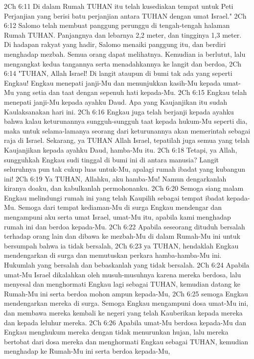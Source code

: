 2Ch 6:11  Di dalam Rumah TUHAN itu telah kusediakan tempat untuk Peti Perjanjian yang berisi batu perjanjian antara TUHAN dengan umat Israel."
2Ch 6:12  Salomo telah membuat panggung perunggu di tengah-tengah halaman Rumah TUHAN. Panjangnya dan lebarnya 2,2 meter, dan tingginya 1,3 meter. Di hadapan rakyat yang hadir, Salomo menaiki panggung itu, dan berdiri menghadap mezbah. Semua orang dapat melihatnya. Kemudian ia berlutut, lalu mengangkat kedua tangannya serta menadahkannya ke langit dan berdoa,
2Ch 6:14  "TUHAN, Allah Israel! Di langit ataupun di bumi tak ada yang seperti Engkau! Engkau menepati janji-Mu dan menunjukkan kasih-Mu kepada umat-Mu yang setia dan taat dengan sepenuh hati kepada-Mu.
2Ch 6:15  Engkau telah menepati janji-Mu kepada ayahku Daud. Apa yang Kaujanjikan itu sudah Kaulaksanakan hari ini.
2Ch 6:16  Engkau juga telah berjanji kepada ayahku bahwa kalau keturunannya sungguh-sungguh taat kepada hukum-Mu seperti dia, maka untuk selama-lamanya seorang dari keturunannya akan memerintah sebagai raja di Israel. Sekarang, ya TUHAN Allah Israel, tepatilah juga semua yang telah Kaujanjikan kepada ayahku Daud, hamba-Mu itu.
2Ch 6:18  Tetapi, ya Allah, sungguhkah Engkau sudi tinggal di bumi ini di antara manusia? Langit seluruhnya pun tak cukup luas untuk-Mu, apalagi rumah ibadat yang kubangun ini!
2Ch 6:19  Ya TUHAN, Allahku, aku hamba-Mu! Namun dengarkanlah kiranya doaku, dan kabulkanlah permohonanku.
2Ch 6:20  Semoga siang malam Engkau melindungi rumah ini yang telah Kaupilih sebagai tempat ibadat kepada-Mu. Semoga dari tempat kediaman-Mu di surga Engkau mendengar dan mengampuni aku serta umat Israel, umat-Mu itu, apabila kami menghadap rumah ini dan berdoa kepada-Mu.
2Ch 6:22  Apabila seseorang dituduh bersalah terhadap orang lain dan dibawa ke mezbah-Mu di dalam Rumah-Mu ini untuk bersumpah bahwa ia tidak bersalah,
2Ch 6:23  ya TUHAN, hendaklah Engkau mendengarkan di surga dan memutuskan perkara hamba-hamba-Mu ini. Hukumlah yang bersalah dan bebaskanlah yang tidak bersalah.
2Ch 6:24  Apabila umat-Mu Israel dikalahkan oleh musuh-musuhnya karena mereka berdosa, lalu menyesal dan menghormati Engkau lagi sebagai TUHAN, kemudian datang ke Rumah-Mu ini serta berdoa mohon ampun kepada-Mu,
2Ch 6:25  semoga Engkau mendengarkan mereka di surga. Semoga Engkau mengampuni dosa umat-Mu ini, dan membawa mereka kembali ke negeri yang telah Kauberikan kepada mereka dan kepada leluhur mereka.
2Ch 6:26  Apabila umat-Mu berdosa kepada-Mu dan Engkau menghukum mereka dengan tidak menurunkan hujan, lalu mereka bertobat dari dosa mereka dan menghormati Engkau sebagai TUHAN, kemudian menghadap ke Rumah-Mu ini serta berdoa kepada-Mu,
